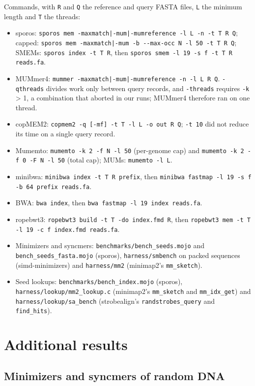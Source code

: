 \documentclass[10pt]{article}
\begin{document}
Commands, with \texttt{R} and \texttt{Q} the reference and query FASTA files, \texttt{L} the minimum length and \texttt{T} the threads:

\begin{itemize}
  \item sporos: \texttt{sporos mem -maxmatch|-mum|-mumreference -l L -n -t T R Q}; capped: \texttt{sporos mem -maxmatch|-mum -b -{}-max-occ N -l 50 -t T R Q}; SMEMs: \texttt{sporos index -t T R}, then \texttt{sporos smem -l 19 -s f -t T R reads.fa}.
  \item MUMmer4: \texttt{mummer -maxmatch|-mum|-mumreference -n -l L R Q}. \texttt{-qthreads} divides work only between query records, and \texttt{-threads} requires \texttt{-k} > 1, a combination that aborted in our runs; MUMmer4 therefore ran on one thread.
  \item copMEM2: \texttt{copmem2 -q [-mf] -t T -l L -o out R Q}; \texttt{-t 10} did not reduce its time on a single query record.
  \item Mumemto: \texttt{mumemto -k 2 -f N -l 50} (per-genome cap) and \texttt{mumemto -k 2 -f 0 -F N -l 50} (total cap); MUMs: \texttt{mumemto -l L}.
  \item minibwa: \texttt{minibwa index -t T R prefix}, then \texttt{minibwa fastmap -l 19 -s f -b 64 prefix reads.fa}.
  \item BWA: \texttt{bwa index}, then \texttt{bwa fastmap -l 19 index reads.fa}.
  \item ropebwt3: \texttt{ropebwt3 build -t T -do index.fmd R}, then \texttt{ropebwt3 mem -t T -l 19 -c f index.fmd reads.fa}.
  \item Minimizers and syncmers: \texttt{benchmarks/bench\_seeds.mojo} and \texttt{bench\_seeds\_fasta.mojo} (sporos), \texttt{harness/smbench} on packed sequences (simd-minimizers) and \texttt{harness/mm2} (minimap2's \texttt{mm\_sketch}).
  \item Seed lookups: \texttt{benchmarks/bench\_index.mojo} (sporos), \texttt{harness/lookup/mm2\_lookup.c} (minimap2's \texttt{mm\_sketch} and \texttt{mm\_idx\_get}) and \texttt{harness/lookup/sa\_bench} (strobealign's \texttt{randstrobes\_query} and \texttt{find\_hits}).
\end{itemize}

\section{Additional results}

\subsection{Minimizers and syncmers of random DNA}
\end{document}
